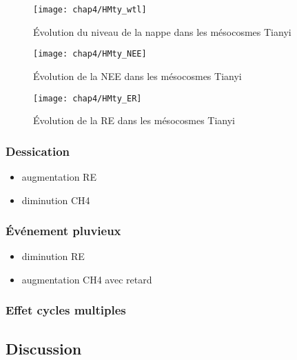 \begin{figure}
\centering
\texttt{[image: chap4/HMty\_wtl]}
\caption{Évolution du niveau de la nappe dans les mésocosmes Tianyi}
\label{fig:HMty_wtl}
\end{figure}

\begin{figure}
\centering
\texttt{[image: chap4/HMty\_NEE]}
\caption{Évolution de la NEE dans les mésocosmes Tianyi}
\label{fig:HMty_NEE}
\end{figure}

\begin{figure}
\centering
\texttt{[image: chap4/HMty\_ER]}
\caption{Évolution de la RE dans les mésocosmes Tianyi}
\label{fig:HMty_ER}
\end{figure}

\subsubsection{Dessication}

\begin{itemize}
\item augmentation RE
\item diminution CH4
\end{itemize}

\subsubsection{Événement pluvieux}

\begin{itemize}
\item diminution RE
\item augmentation CH4 avec retard
\end{itemize}

\subsubsection{Effet cycles multiples}

\subsection{Discussion}

